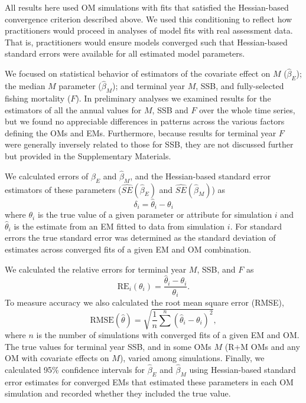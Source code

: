 \documentclass[
  12pt,
]{article}
\begin{document}
All results here used OM simulations with fits that satisfied the Hessian-based convergence criterion described above. We used this conditioning to reflect how practitioners would proceed in analyses of model fits with real assessment data. That is, practitioners would ensure models converged such that Hessian-based standard errors were available for all estimated model parameters.

We focused on statistical behavior of estimators of the covariate effect on \(M\) (\(\widehat \beta_E\)); the median \(M\) parameter (\(\widehat \beta_M\)); and terminal year \(M\), SSB, and fully-selected fishing mortality (\(F\)). In preliminary analyses we examined results for the estimators of all the annual values for \(M\), SSB and \(F\) over the whole time series, but we found no appreciable differences in patterns across the various factors defining the OMs and EMs. Furthermore, because results for terminal year \(F\) were generally inversely related to those for SSB, they are not discussed further but provided in the Supplementary Materials.

We calculated errors of \(\widehat \beta_E\) and \(\widehat \beta_M\), and the Hessian-based standard error estimators of these parameters (\(\widehat{SE}\left(\widehat \beta_E\right)\) and \(\widehat{SE}\left(\widehat \beta_M\right)\)) as
\[
\delta_i = \widehat \theta_i - \theta_i
\]
where \(\theta_i\) is the true value of a given parameter or attribute for simulation \(i\) and \(\widehat \theta_i\) is the estimate from an EM fitted to data from simulation \(i\). For standard errors the true standard error was determined as the standard deviation of estimates across converged fits of a given EM and OM combination.

We calculated the relative errors for terminal year \(M\), SSB, and \(F\) as
\begin{equation}\label{relerror}
\text{RE}_i\left(\theta_i\right) = \frac{\widehat \theta_i - \theta_i}{\theta_i}.
\end{equation}
To measure accuracy we also calculated the root mean square error (RMSE),
\[
\text{RMSE}\left(\widehat \theta\right) = \sqrt{\frac{1}{n}\sum^n\left(\widehat \theta_i - \theta_i\right)^2},
\]
where \(n\) is the number of simulations with converged fits of a given EM and OM. The true values for terminal year SSB, and in some OMs \(M\) (R+M OMs and any OM with covariate effects on \(M\)), varied among simulations. Finally, we calculated 95\% confidence intervals for \(\widehat \beta_E\) and \(\widehat \beta_M\) using Hessian-based standard error estimates for converged EMs that estimated these parameters in each OM simulation and recorded whether they included the true value.
\end{document}
